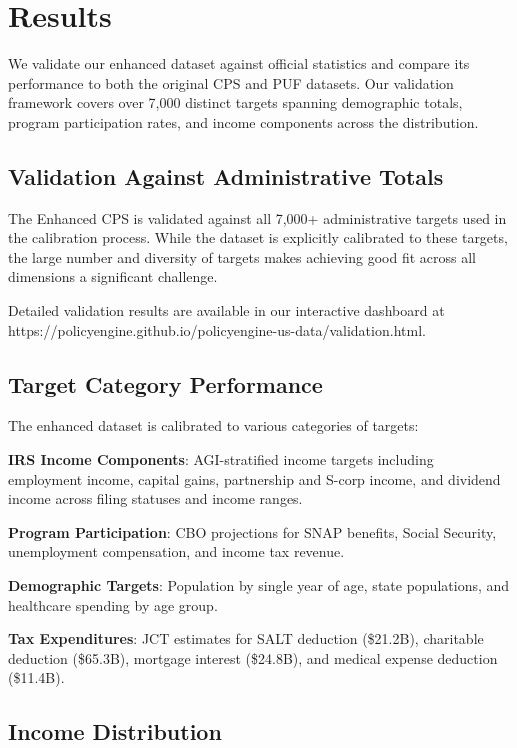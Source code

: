 \section{Results}

We validate our enhanced dataset against official statistics and compare its performance to both the original CPS and PUF datasets. Our validation framework covers over 7,000 distinct targets spanning demographic totals, program participation rates, and income components across the distribution.

\subsection{Validation Against Administrative Totals}

The Enhanced CPS is validated against all 7,000+ administrative targets used in the calibration process. While the dataset is explicitly calibrated to these targets, the large number and diversity of targets makes achieving good fit across all dimensions a significant challenge.

Detailed validation results are available in our interactive dashboard at https://policyengine.github.io/policyengine-us-data/validation.html.

\subsection{Target Category Performance}

The enhanced dataset is calibrated to various categories of targets:

\textbf{IRS Income Components}: AGI-stratified income targets including employment income, capital gains, partnership and S-corp income, and dividend income across filing statuses and income ranges.

\textbf{Program Participation}: CBO projections for SNAP benefits, Social Security, unemployment compensation, and income tax revenue.

\textbf{Demographic Targets}: Population by single year of age, state populations, and healthcare spending by age group.

\textbf{Tax Expenditures}: JCT estimates for SALT deduction (\$21.2B), charitable deduction (\$65.3B), mortgage interest (\$24.8B), and medical expense deduction (\$11.4B).

\subsection{Income Distribution}

